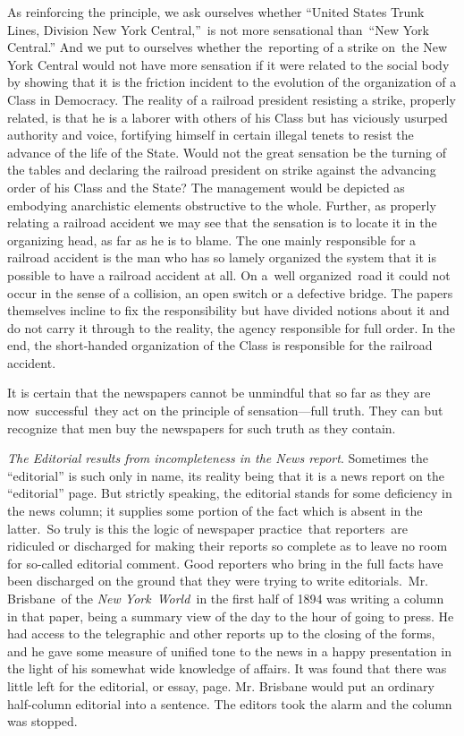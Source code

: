 \documentclass[openany,nobib]{tufte-book}
\begin{document}
As reinforcing the principle, we ask ourselves whether ``United States
Trunk Lines, Division New York Central,''~is not more sensational
than~``New York Central.'' And we put to ourselves whether the~reporting
of a strike on~the New York Central would not have more sensation if it
were related to the social body by showing that it is the friction
incident to the evolution of the organization of a Class in Democracy.
The reality of a railroad president resisting a strike, properly
related, is that he is a laborer with others of his Class but has
viciously usurped authority and voice, fortifying himself in certain
illegal tenets to resist the advance of the life of the State. Would not
the great sensation be the turning of the tables and declaring the
railroad president on strike against the advancing order of his Class
and the State? The management would be depicted as embodying anarchistic
elements obstructive to the whole. Further, as properly relating a
railroad accident we may see that the sensation is to locate it in the
organizing head, as far as he is to blame. The one mainly responsible
for a railroad accident is the man who has so lamely organized the
system that it is possible to have a railroad accident at all. On a~well
organized~road it could not occur in the sense of a collision, an open
switch or a defective bridge. The papers themselves incline to fix the
responsibility but have divided notions about it and do not carry it
through to the reality, the agency responsible for full order. In the
end, the short-handed organization of the Class is responsible for the
railroad accident.~

It is certain that the newspapers cannot be unmindful that so far as
they are now~successful~they act on the principle of sensation---full
truth. They can but recognize that men buy the newspapers for such truth
as they contain.~

\vspace{0.05in}

\emph{The Editorial results from incompleteness in the News report}.
Sometimes the ``editorial'' is such only in name, its reality being that
it is a news report on the ``editorial'' page. But strictly speaking,
the editorial stands for some deficiency in the news column; it supplies
some portion of the fact which is absent in the latter.~So truly is this
the logic of newspaper practice~that reporters~are ridiculed or
discharged for making their reports so complete as to leave no room for
so-called editorial comment. Good reporters who bring in the full facts
have been discharged on the ground that they were trying to write
editorials.~Mr. Brisbane~of the \emph{New York}~\emph{World~}in the
first half of 1894 was writing a column in that paper, being a summary
view of the day to the hour of going to press. He had access to the
telegraphic and other reports up to the closing of the forms, and he
gave some measure of unified tone to the news in a happy presentation in
the light of his somewhat wide knowledge of affairs. It was found that
there was little left for the editorial, or essay, page. Mr. Brisbane
would put an ordinary half-column editorial into a sentence. The editors
took the alarm and the column was stopped.~
\end{document}
